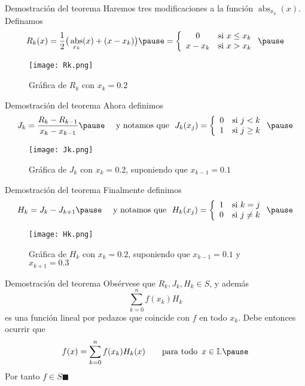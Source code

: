\documentclass[xcolor=dvipsnames,10pt,handout, draft]{beamer}
\DeclareMathOperator{\abs}{abs}
\newcommand{\intunit}{\mathbb I}
\begin{document}
\begin{frame}{Demostraci\'on del teorema}\pause
Haremos tres modificaciones a la funci\'on $\abs_{x_k}(x)$.
\pause\vskip5pt
Definamos 
$$R_k(x)=\frac{1}{2}\big(\abs_{x_k}(x)+(x-x_k)\big)\pause=\left\{\begin{array}{cc}
													0&\text{si }x\leq x_k\\
													x-x_k&\text{si }x> x_k
												\end{array}\right.\pause$$
\begin{figure}
\texttt{[image: Rk.png]}
\caption{Gr\'afica de $R_{k}$  con $x_k=0.2$}
\end{figure}
\end{frame}


\begin{frame}{Demostraci\'on del teorema}
Ahora definimos 
$$J_k=\frac{R_k-R_{k-1}}{x_k-x_{k-1}}\pause\quad\text{ y notamos que }\,\,J_k(x_j)=\left\{\begin{array}{cc}
													0&\text{si }j< k\\
													1&\text{si }j\geq k
												\end{array}\right.\pause$$
\begin{figure}
\texttt{[image: Jk.png]}
\caption{Gr\'afica de $J_{k}$  con $x_k=0.2$, suponiendo que $x_{k-1}=0.1$}
\end{figure}
\end{frame}


\begin{frame}{Demostraci\'on del teorema}
Finalmente definimos 
$$H_k=J_k-J_{k+1}\pause\quad\text{ y notamos que }\,\,H_k(x_j)=\left\{\begin{array}{cc}
													1&\text{si }k=j\\
													0&\text{si }j\neq k
												\end{array}\right.\pause$$
\begin{figure}
\texttt{[image: Hk.png]}
\caption{Gr\'afica de $H_{k}$  con $x_k=0.2$, suponiendo que $x_{k-1}=0.1$ y $x_{k+1}=0.3$}
\end{figure}
\end{frame}


\begin{frame}{Demostraci\'on del teorema}
Obs\'ervese que $R_k,J_k,H_k\in S$, \pause y adem\'as
$$\sum_{k=0}^nf(x_k)H_k$$
es una funci\'on lineal por pedazos que coincide con $f$ en todo $x_k$.
\vskip5pt\pause
Debe entonces ocurrir que 
$$f(x)=\sum_{k=0}^nf(x_k)H_k(x)\qquad\text{para todo }\,x\in\intunit.\pause$$
Por tanto $f\in S$\hfill$\blacksquare$
\end{frame}
\end{document}
